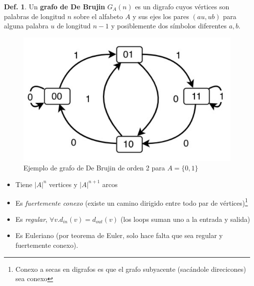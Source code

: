 \documentclass{report}
\theoremstyle{definition} %
\newtheorem{definition}{Def.}
\begin{document}
\begin{definition}
    Un \textbf{grafo de De Brujin} $G_A(n)$ es un digrafo cuyos vértices son
    palabras de longitud $n$ sobre el alfabeto $A$ y sus ejes los pares $(au,
    ub)$ para alguna palabra $u$ de longitud $n - 1$ y posiblemente dos símbolos
    diferentes $a, b$.

    \begin{figure}[H]
        \centering
        \includegraphics[scale=0.3]{img/2_de_brujin_01.png}
        \caption{Ejemplo de grafo de De Brujin de orden 2 para $A = \{0, 1\}$}
    \end{figure}
    
    \begin{itemize}
        \item Tiene $|A|^n$ vertices y $|A|^{n+1}$ arcos
        \item Es \textit{fuertemente conexo} (existe un camino dirigido entre
        todo par de vértices)\footnote{Conexo a secas en digrafos es que el grafo
        subyacente (sacándole direcicones) sea conexo}
        \item Es \textit{regular}, $\forall v. d_{in}(v) = d_{out}(v)$ (los
        loops suman uno a la entrada y salida)
        \item Es Euleriano (por teorema de Euler, solo hace falta que sea
        regular y fuertemente conexo).
    \end{itemize}
\end{definition}
\end{document}
